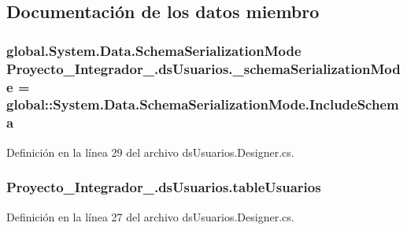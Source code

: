 \subsection{Documentación de los datos miembro}
\hypertarget{class_proyecto___integrador__3_1_1ds_usuarios_ade4264ac0fd740b0a613434466196ccd}{
\subsubsection[{\-\_\-schema\-Serialization\-Mode}]{\setlength{\rightskip}{0pt plus 5cm}global.\-System.\-Data.\-Schema\-Serialization\-Mode Proyecto\-\_\-\-Integrador\-\_.\-ds\-Usuarios.\-\_\-schema\-Serialization\-Mode = global\-::\-System.\-Data.\-Schema\-Serialization\-Mode.\-Include\-Schema\hspace{0.3cm}{\ttfamily [private]}}}\label{class_proyecto___integrador__3_1_1ds_usuarios_ade4264ac0fd740b0a613434466196ccd}


Definición en la línea 29 del archivo ds\-Usuarios.\-Designer.\-cs.

\hypertarget{class_proyecto___integrador__3_1_1ds_usuarios_ac781e37ef17f9af35bb464c73a041847}{
\subsubsection[{table\-Usuarios}]{ Proyecto\-\_\-\-Integrador\-\_.\-ds\-Usuarios.\-table\-Usuarios\hspace{0.3cm}{\ttfamily [private]}}}\label{class_proyecto___integrador__3_1_1ds_usuarios_ac781e37ef17f9af35bb464c73a041847}


Definición en la línea 27 del archivo ds\-Usuarios.\-Designer.\-cs.



